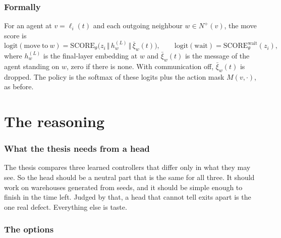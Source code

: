 \documentclass[11pt,a4paper]{article}
\begin{document}
\section{Formally}

For an agent at $v = \ell_i(t)$ and each outgoing neighbour
$w \in N^{+}(v)$, the move score is
\begin{equation}
  \mathrm{logit}(\mathrm{move\ to\ } w) = \mathrm{SCORE}_\theta\bigl(z_i \,\Vert\,
    h_w^{(L)} \,\Vert\, \bar\xi_w(t)\bigr), \qquad
  \mathrm{logit}(\mathrm{wait}) = \mathrm{SCORE}^{\mathrm{wait}}_\theta(z_i),
\end{equation}
where $h_w^{(L)}$ is the final-layer embedding at $w$ and $\bar\xi_w(t)$ is
the message of the agent standing on $w$, zero if there is none. With
communication off, $\bar\xi_w(t)$ is dropped. The policy is the softmax of
these logits plus the action mask $M(v,\cdot)$, as before.

\part{The reasoning}

\section{What the thesis needs from a head}

The thesis compares three learned controllers that differ only in what they
may see. So the head should be a neutral part that is the same for all
three. It should work on warehouses generated from seeds, and it should be
simple enough to finish in the time left. Judged by that, a head that cannot
tell exits apart is the one real defect. Everything else is taste.

\section{The options}
\end{document}
